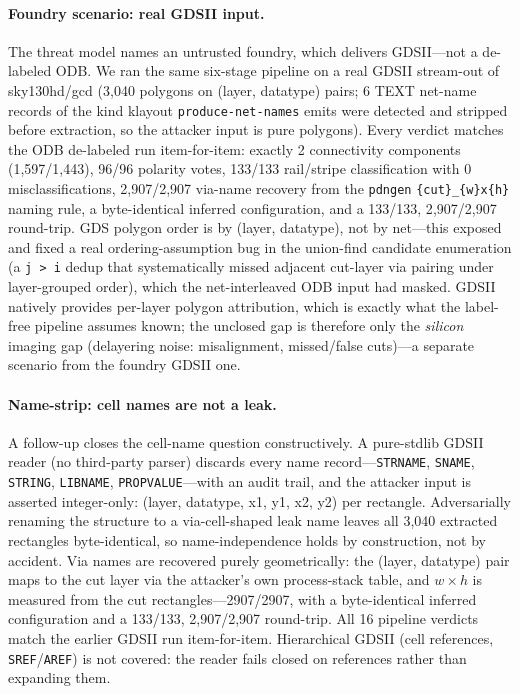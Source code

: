 \documentclass[11pt]{article}
\begin{document}
\paragraph{Foundry scenario: real GDSII input.}  The threat model names
an untrusted foundry, which delivers GDSII---not a de-labeled ODB.  We
ran the same six-stage pipeline on a real GDSII stream-out of
sky130hd/gcd (3{,}040 polygons on (layer, datatype) pairs; 6 TEXT
net-name records of the kind klayout \texttt{produce-net-names} emits
were detected and stripped before extraction, so the attacker input is
pure polygons).  Every verdict matches the ODB de-labeled run
item-for-item: exactly 2 connectivity components (1{,}597/1{,}443),
96/96 polarity votes, 133/133 rail/stripe classification with 0
misclassifications, 2{,}907/2{,}907 via-name recovery from the
\texttt{pdngen} \texttt{\{cut\}\_\{w\}x\{h\}} naming rule, a
byte-identical inferred configuration, and a 133/133, 2{,}907/2{,}907
round-trip.  GDS polygon order is by (layer, datatype), not by
net---this exposed and fixed a real ordering-assumption bug in the
union-find candidate enumeration (a \texttt{j > i} dedup that
systematically missed adjacent cut-layer via pairing under layer-grouped
order), which the net-interleaved ODB input had masked.  GDSII natively
provides per-layer polygon attribution, which is exactly what the
label-free pipeline assumes known; the unclosed gap is therefore only
the \emph{silicon} imaging gap (delayering noise: misalignment,
missed/false cuts)---a separate scenario from the foundry GDSII one.

\paragraph{Name-strip: cell names are not a leak.} A follow-up closes
the cell-name question constructively.  A pure-stdlib GDSII reader (no
third-party parser) discards every name record---\texttt{STRNAME},
\texttt{SNAME}, \texttt{STRING}, \texttt{LIBNAME},
\texttt{PROPVALUE}---with an audit trail, and the attacker input is
asserted integer-only: (layer, datatype, x1, y1, x2, y2) per rectangle.
Adversarially renaming the structure to a via-cell-shaped leak name
leaves all 3{,}040 extracted rectangles byte-identical, so
name-independence holds by construction, not by accident.  Via names are
recovered purely geometrically: the (layer, datatype) pair maps to the
cut layer via the attacker's own process-stack table, and $w \times h$
is measured from the cut rectangles---2907/2907, with a byte-identical
inferred configuration and a 133/133, 2{,}907/2{,}907 round-trip.  All
16 pipeline verdicts match the earlier GDSII run item-for-item.
Hierarchical GDSII (cell references, \texttt{SREF}/\texttt{AREF}) is
not covered: the reader fails closed on references rather than
expanding them.
\end{document}
